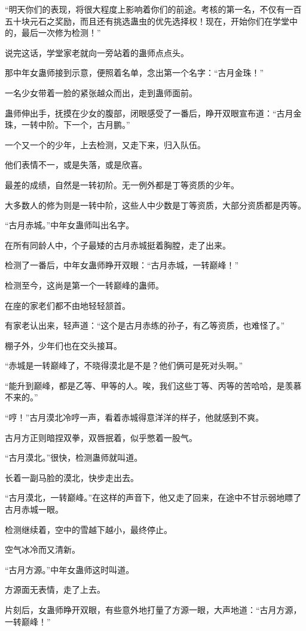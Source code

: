\begin{this_body}
“明天你们的表现，将很大程度上影响着你们的前途。考核的第一名，不仅有一百五十块元石之奖励，而且还有挑选蛊虫的优先选择权！现在，开始你们在学堂中的，最后一次修为检测！”

说完这话，学堂家老就向一旁站着的蛊师点点头。

那中年女蛊师接到示意，便照着名单，念出第一个名字：“古月金珠！”

一名少女带着一脸的紧张越众而出，走到蛊师面前。

蛊师伸出手，抚摸在少女的腹部，闭眼感受了一番后，睁开双眼宣布道：“古月金珠，一转中阶。下一个，古月鹏。”

一个又一个的少年，上去检测，又走下来，归入队伍。

他们表情不一，或是失落，或是欣喜。

最差的成绩，自然是一转初阶。无一例外都是丁等资质的少年。

大多数人的修为则是一转中阶，这些人中少数是丁等资质，大部分资质都是丙等。

“古月赤城。”中年女蛊师叫出名字。

在所有同龄人中，个子最矮的古月赤城挺着胸膛，走了出来。

检测了一番后，中年女蛊师睁开双眼：“古月赤城，一转巅峰！”

检测至今，这尚是第一个一转巅峰的蛊师。

在座的家老们都不由地轻轻颔首。

有家老认出来，轻声道：“这个是古月赤练的孙子，有乙等资质，也难怪了。”

棚子外，少年们也在交头接耳。

“赤城是一转巅峰了，不晓得漠北是不是？他们俩可是死对头啊。”

“能升到巅峰，都是乙等、甲等的人。唉，我们这些丁等、丙等的苦哈哈，是羡慕不来的。”

“哼！”古月漠北冷哼一声，看着赤城得意洋洋的样子，他就感到不爽。

古月方正则暗捏双拳，双唇抿着，似乎憋着一股气。

“古月漠北。”很快，检测蛊师就叫道。

长着一副马脸的漠北，快步走出去。

“古月漠北，一转巅峰。”在这样的声音下，他又走了回来，在途中不甘示弱地瞟了古月赤城一眼。

检测继续着，空中的雪越下越小，最终停止。

空气冰冷而又清新。

“古月方源。”中年女蛊师这时叫道。

方源面无表情，走了上去。

片刻后，女蛊师睁开双眼，有些意外地打量了方源一眼，大声地道：“古月方源，一转巅峰！”


\end{this_body}
